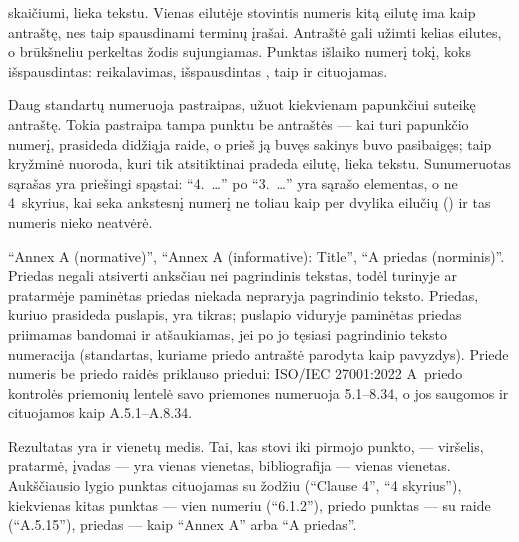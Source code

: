 \begin{description}
    skaičiumi, lieka tekstu. Vienas eilutėje stovintis numeris kitą eilutę ima kaip antraštę,
    nes taip spausdinami terminų įrašai. Antraštė gali užimti kelias eilutes, o brūkšneliu
    perkeltas žodis sujungiamas. Punktas išlaiko numerį tokį, koks išspausdintas: reikalavimas,
    išspausdintas , taip ir cituojamas.
  \item[Sunumeruotos pastraipos ir sąrašai.] Daug standartų numeruoja pastraipas, užuot
    kiekvienam papunkčiui suteikę antraštę. Tokia pastraipa tampa punktu be antraštės ---
    kai turi papunkčio numerį, prasideda didžiąja raide, o prieš ją buvęs sakinys buvo
    pasibaigęs; taip kryžminė nuoroda, kuri tik atsitiktinai pradeda eilutę, lieka tekstu.
    Sunumeruotas sąrašas yra priešingi spąstai: \enquote{4.~…} po \enquote{3.~…} yra sąrašo
    elementas, o ne 4~skyrius, kai seka ankstesnį numerį ne toliau kaip per dvylika eilučių
    () ir tas numeris nieko neatvėrė.
  \item[Priedai.] \enquote{Annex A (normative)}, \enquote{Annex A (informative): Title},
    \enquote{A priedas (norminis)}. Priedas negali atsiverti anksčiau nei pagrindinis tekstas,
    todėl turinyje ar pratarmėje paminėtas priedas niekada nepraryja pagrindinio teksto. Priedas,
    kuriuo prasideda puslapis, yra tikras; puslapio viduryje paminėtas priedas priimamas
    bandomai ir atšaukiamas, jei po jo tęsiasi pagrindinio teksto numeracija (standartas,
    kuriame priedo antraštė parodyta kaip pavyzdys). Priede numeris be priedo raidės
    priklauso priedui: ISO/IEC 27001:2022 A~priedo kontrolės priemonių lentelė savo priemones
    numeruoja 5.1–8.34, o jos saugomos ir cituojamos kaip A.5.1–A.8.34.
\end{description}

Rezultatas yra  ir  vienetų medis. Tai, kas stovi iki pirmojo punkto,
--- viršelis, pratarmė, įvadas --- yra vienas  vienetas, bibliografija --- vienas
 vienetas. Aukščiausio lygio punktas cituojamas su žodžiu (\enquote{Clause 4},
\enquote{4 skyrius}), kiekvienas kitas punktas --- vien numeriu (\enquote{6.1.2}), priedo
punktas --- su raide (\enquote{A.5.15}), priedas --- kaip \enquote{Annex A} arba
\enquote{A priedas}.

